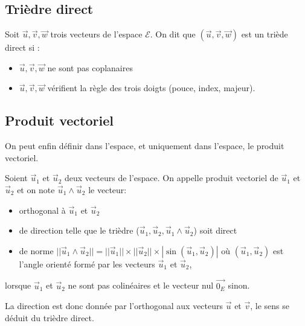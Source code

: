 \documentclass[letterpaper,10pt,english]{jupyterBook}
\begin{document}
\subsection{Trièdre direct}
\label{\detokenize{Part1/Cours:triedre-direct}}
\sphinxAtStartPar
Soit \(\vec{u},\vec{v},\vec{w}\)  trois vecteurs de l’espace \(\mathcal{E}\). On dit que \((\vec{u},\vec{v},\vec{w})\) est un triède direct si :
\begin{itemize}
\item {} 
\sphinxAtStartPar
\(\vec{u},\vec{v},\vec{w}\) ne sont pas coplanaires

\item {} 
\sphinxAtStartPar
\(\vec{u},\vec{v},\vec{w}\) vérifient la règle des trois doigts (pouce, index, majeur).

\end{itemize}


\subsection{Produit vectoriel}
\label{\detokenize{Part1/Cours:id1}}
\sphinxAtStartPar
On peut enfin définir dans l’espace, et uniquement dans l’espace, le produit vectoriel.

\sphinxAtStartPar
{}

\sphinxAtStartPar
Soient \(\vec{u}_1\) et \(\vec{u}_2\) deux vecteurs de l’espace. On appelle produit vectoriel de \(\vec{u}_1\) et \(\vec{u}_2\) et on note \(\vec{u}_1 \wedge \vec{u}_2\) le vecteur:
\begin{itemize}
\item {} 
\sphinxAtStartPar
orthogonal à \(\vec{u}_1\) et \(\vec{u}_2\)

\item {} 
\sphinxAtStartPar
de direction telle que le trièdre (\(\vec{u}_1,\vec{u}_2,\vec{u}_1 \wedge \vec{u}_2\)) soit direct

\item {} 
\sphinxAtStartPar
de norme \(||\vec{u}_1 \wedge \vec{u}_2|| = ||\vec{u}_1 || \times || \vec{u}_2|| \times |\sin(\vec{u}_1,\vec{u}_2)|\) où \((\vec{u}_1,\vec{u}_2)\) est l’angle orienté formé par les vecteurs \(\vec{u}_1\) et \(\vec{u}_2\),

\end{itemize}

\sphinxAtStartPar
lorsque  \(\vec{u}_1\) et \(\vec{u}_2\) ne sont pas colinéaires et le vecteur nul \(\vec{0_E}\) sinon.

\sphinxAtStartPar
{} La direction est donc donnée par l’orthogonal aux vecteurs \(\vec{u}\) et \(\vec{v}\), le sens se déduit du trièdre direct.
\end{document}
